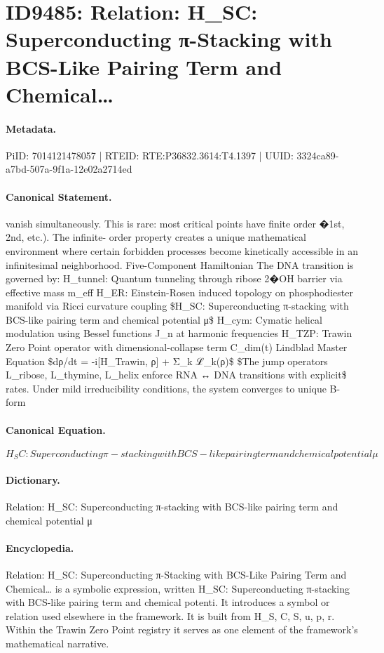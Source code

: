 \section*{ID9485: Relation: H\_SC: Superconducting π-Stacking with BCS-Like Pairing Term and Chemical…}
\paragraph{Metadata.}
PiID: 7014121478057 | RTEID: RTE:P36832.3614:T4.1397 | UUID: 3324ca89-a7bd-507a-9f1a-12e02a2714ed

\paragraph{Canonical Statement.}
vanish simultaneously. This is rare: most critical points have finite order �1st, 2nd, etc.). The infinite- order property creates a unique mathematical environment where certain forbidden processes become kinetically accessible in an infinitesimal neighborhood. Five-Component Hamiltonian The DNA transition is governed by: H\_tunnel: Quantum tunneling through ribose 2�OH barrier via effective mass m\_eff H\_ER: Einstein-Rosen induced topology on phosphodiester manifold via Ricci curvature coupling \$H\_SC: Superconducting π-stacking with BCS-like pairing term and chemical potential μ\$ H\_cym: Cymatic helical modulation using Bessel functions J\_n at harmonic frequencies H\_TZP: Trawin Zero Point operator with dimensional-collapse term C\_dim(t) Lindblad Master Equation \$dρ/dt = -i[H\_Trawin, ρ] + Σ\_k ℒ\_k(ρ)\$ \$The jump operators L\_ribose, L\_thymine, L\_helix enforce RNA ↔ DNA transitions with explicit\$ rates. Under mild irreducibility conditions, the system converges to unique B-form

\paragraph{Canonical Equation.}
\[
H_SC: Superconducting π-stacking with BCS-like pairing term and chemical potential μ
\]

\paragraph{Dictionary.}
Relation: H\_SC: Superconducting π-stacking with BCS-like pairing term and chemical potential μ

\paragraph{Encyclopedia.}
Relation: H\_SC: Superconducting π-Stacking with BCS-Like Pairing Term and Chemical… is a symbolic expression, written H\_SC: Superconducting π-stacking with BCS-like pairing term and chemical potenti. It introduces a symbol or relation used elsewhere in the framework. It is built from H\_S, C, S, u, p, r. Within the Trawin Zero Point registry it serves as one element of the framework's mathematical narrative.
